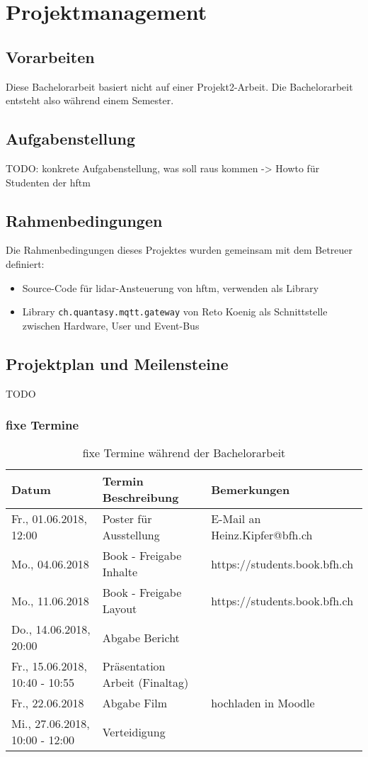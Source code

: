 \chapter{Projektmanagement}
\section{Vorarbeiten}
Diese Bachelorarbeit basiert nicht auf einer Projekt2-Arbeit. Die Bachelorarbeit entsteht also während einem Semester.

\section{Aufgabenstellung}
\label{sec:aufgabenstellung-messbar}
TODO:
konkrete Aufgabenstellung, was soll raus kommen -> Howto für Studenten der \acrshort{hftm}

\section{Rahmenbedingungen}
Die Rahmenbedingungen dieses Projektes wurden gemeinsam mit dem Betreuer definiert:
\begin{itemize}
	\item Source-Code für \acrshort{lidar}-Ansteuerung von \acrshort{hftm}, verwenden als Library
	\item Library \verb|ch.quantasy.mqtt.gateway|\cite{ch.quantasy.mqtt.gateway} von Reto Koenig als Schnittstelle zwischen Hardware, User und Event-Bus
\end{itemize}

\section{Projektplan und Meilensteine}
TODO
\subsection{fixe Termine}
\begin{table}[H]
	\centering
	\begin{tabular}{lll} \toprule
		\textbf{Datum} 			& \textbf{Termin Beschreibung}		& \textbf{Bemerkungen}		\\ \midrule
		Fr., 01.06.2018, 12:00		& Poster für Ausstellung 		& E-Mail an Heinz.Kipfer@bfh.ch	\\ \midrule
		Mo., 04.06.2018 		& Book - Freigabe Inhalte		& https://students.book.bfh.ch	\\ \midrule
		Mo., 11.06.2018 		& Book - Freigabe Layout		& https://students.book.bfh.ch	\\ \midrule
		Do., 14.06.2018, 20:00		& Abgabe Bericht			&  				\\ \midrule
		Fr., 15.06.2018, 10:40 - 10:55	& Präsentation Arbeit (Finaltag)	&  				\\ \midrule
		Fr., 22.06.2018			& Abgabe Film				& hochladen in Moodle		\\ \midrule
		Mi., 27.06.2018, 10:00 - 12:00	& Verteidigung				&				\\ \bottomrule
	\end{tabular}
	\caption{fixe Termine während der Bachelorarbeit}
	\label{tab:fixeTermine}
\end{table}


